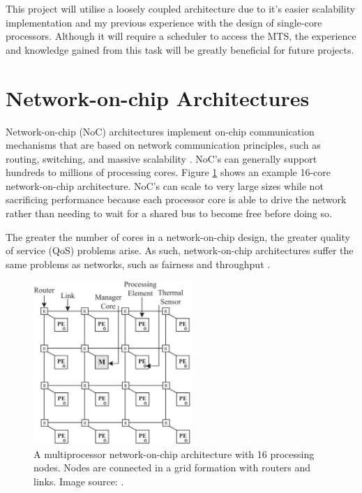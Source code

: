This project will utilise a loosely coupled architecture due to it's easier scalability implementation and my previous experience with the design of single-core processors. Although it will require a scheduler to access the MTS, the experience and knowledge gained from this task will be greatly beneficial for future projects.

\section{Network-on-chip Architectures}
Network-on-chip (NoC) architectures implement on-chip communication mechanisms that are based on network communication  principles, such as routing, switching, and massive scalability \cite{newnoc}. NoC's can generally support hundreds to millions of processing cores.
Figure \ref{fig:noc} shows an example 16-core network-on-chip architecture. 
NoC's can scale to very large sizes while not sacrificing performance because each processor core is able to drive the network rather than needing to wait for a shared bus to become free before doing so.

The greater the number of cores in a network-on-chip design, the greater quality of service (QoS) problems arise. As such, network-on-chip architectures suffer the same problems as networks, such as fairness and throughput \cite{nocfairness}.


\begin{figure}[h]
\centering
\includegraphics[width=6cm]{../img/noc}
\caption{A multiprocessor network-on-chip architecture with 16 processing nodes. Nodes are connected in a grid formation with routers and links. Image source: \cite{noc}.}
\label{fig:noc}
\end{figure}
